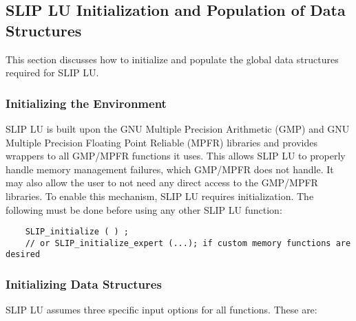 \documentclass[12pt]{article}
\theoremstyle{definition}
\begin{document}
\cprotect\subsection{SLIP LU Initialization and Population of Data Structures}
\label{s:Using:init}

This section discusses how to initialize and populate the global data
structures required for SLIP LU.

\subsubsection{Initializing the Environment}

SLIP LU is built upon the GNU Multiple Precision Arithmetic (GMP)
\cite{granlund2015gnu} and GNU Multiple Precision Floating Point Reliable
(MPFR) \cite{fousse2007mpfr} libraries and provides
wrappers to all GMP/MPFR functions it uses.
This allows SLIP LU to properly handle
memory management failures, which GMP/MPFR does not handle.
It may also allow the
user to not need any direct access to the GMP/MPFR libraries.  To enable this
mechanism, SLIP LU requires initialization.  The following must be done before
using any other SLIP LU function:


\begin{mdframed}[userdefinedwidth=6in]
{\footnotesize
\begin{verbatim}
    SLIP_initialize ( ) ;
    // or SLIP_initialize_expert (...); if custom memory functions are desired
\end{verbatim}
} \end{mdframed}


\subsubsection{Initializing Data Structures}
\label{ss:init}

SLIP LU assumes three specific input options for all functions. These are:
\end{document}
